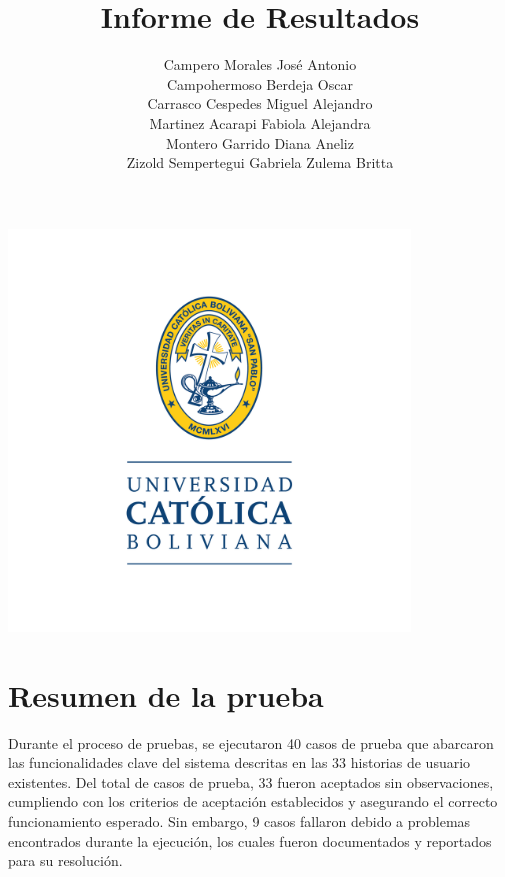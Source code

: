 \documentclass[stu, 12pt, letterpaper, donotrepeattitle, floatsintext, natbib]{apa7}
\title{\Large Informe de Resultados }
\author{
    Campero Morales José Antonio \\
    Campohermoso Berdeja Oscar \\
    Carrasco Cespedes Miguel Alejandro \\
    Martinez Acarapi Fabiola Alejandra \\
    Montero Garrido Diana Aneliz \\
    Zizold Sempertegui Gabriela Zulema Britta
}
\affiliation{Universidad Católica Boliviana}
\begin{document}
\thispagestyle{empty}

\centering
\includegraphics[width=0.8\textwidth]{../imgs/logo-ucb.png} %
\vspace{-5cm} %

\maketitle

\newpage
{}
\renewcommand\contentsname{\large Índice}
\tableofcontents
\setcounter{tocdepth}{2}
\newpage
\renewcommand{\listfigurename}{\large Índice de figuras}
\listoffigures
\newpage
\renewcommand{\listtablename}{\large Índice de tablas}
\listoftables
\newpage

\section{\large Resumen de la prueba}
Durante el proceso de pruebas, se ejecutaron 40 casos de prueba que abarcaron las funcionalidades clave del sistema descritas en las 33 historias de usuario existentes. Del total de casos de prueba, 33 fueron aceptados sin observaciones, cumpliendo con los criterios de aceptación establecidos y asegurando el correcto funcionamiento esperado. Sin embargo, 9 casos fallaron debido a problemas encontrados durante la ejecución, los cuales fueron documentados y reportados para su resolución. 
\end{document}
